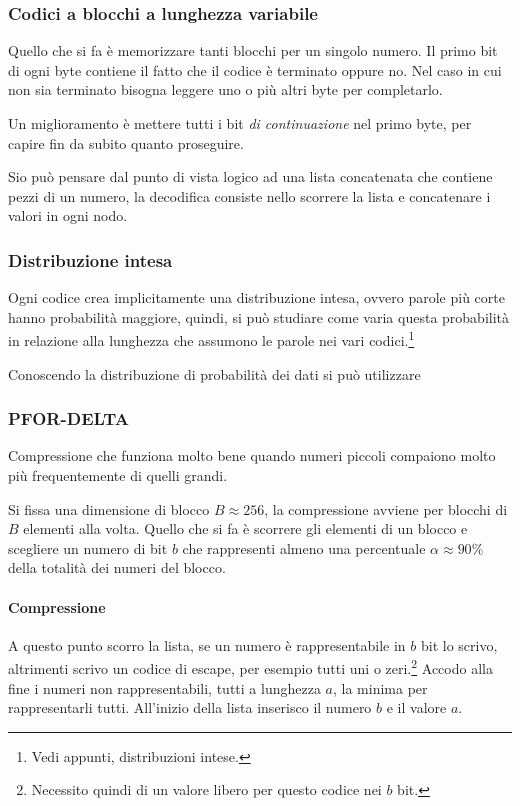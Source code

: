 \subsubsection{Codici a blocchi a lunghezza variabile}
Quello che si fa è memorizzare tanti blocchi per un singolo 
numero. Il primo bit di ogni byte contiene il fatto che 
il codice è terminato oppure no. Nel caso in cui non sia terminato 
bisogna leggere uno o più altri byte per completarlo. 

Un miglioramento è mettere tutti i bit \emph{di continuazione} 
nel primo byte, per capire fin da subito quanto proseguire.

Sio può pensare dal punto di vista logico ad una lista concatenata 
che contiene pezzi di un numero, la decodifica consiste nello scorrere 
la lista e concatenare i valori in ogni nodo.

\subsubsection{Distribuzione intesa}
Ogni codice crea implicitamente una distribuzione intesa, 
ovvero parole più corte hanno probabilità maggiore, quindi, si 
può studiare come varia questa probabilità in relazione alla lunghezza 
che assumono le parole nei vari codici.\footnote{Vedi appunti, distribuzioni intese.}

Conoscendo la distribuzione di probabilità dei dati si può utilizzare 

\subsubsection{PFOR-DELTA}
Compressione che funziona molto bene quando numeri piccoli compaiono 
molto più frequentemente di quelli grandi.

Si fissa una dimensione di blocco $B \approx 256$, la compressione avviene 
per blocchi di $B$ elementi alla volta.
Quello che si fa è scorrere gli elementi di un blocco e scegliere 
un numero di bit $b$ che rappresenti almeno una percentuale $\alpha \approx 90\%$ della totalità dei numeri del blocco. 

\paragraph{Compressione}
A questo punto scorro la lista, 
se un numero è rappresentabile in $b$ bit lo scrivo, altrimenti 
scrivo un codice di escape, per esempio tutti uni o zeri.\footnote{Necessito quindi di un valore libero per questo codice nei $b$ bit.} Accodo alla fine i numeri non rappresentabili, tutti a lunghezza $a$,
la minima per rappresentarli tutti.
All'inizio della lista inserisco il numero $b$ e il valore $a$.

